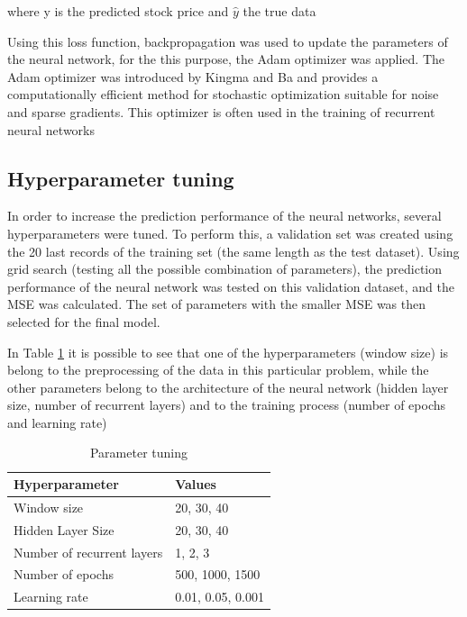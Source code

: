 \documentclass[10pt,twocolumn,letterpaper]{article}
\begin{document}
where y is the predicted stock price and $\hat{y}$ the true data

Using this loss function, backpropagation was used to update the parameters of the neural network, for the this purpose, the Adam optimizer was applied. The Adam optimizer was introduced by Kingma and Ba \cite{Kingma2015} and provides a computationally efficient method for stochastic optimization suitable for noise and sparse gradients. This optimizer is often used in the training of recurrent neural networks \cite{Zhao2020}

\subsection{Hyperparameter tuning}


In order to increase the prediction performance of the neural networks, several hyperparameters were tuned. To perform this, a validation set was created using the 20 last records of the training set (the same length as the test dataset). Using grid search (testing all the possible combination of parameters), the prediction performance of the neural network was tested on this validation dataset, and the MSE was calculated. The set of parameters with the smaller MSE was then selected for the final model.

In Table \ref{table:tuning} it is possible to see that one of the hyperparameters (window size) is belong to the preprocessing of the data in this particular problem, while the other parameters belong to the architecture of the neural network (hidden layer size, number of recurrent layers) and to the training process (number of epochs and learning rate)

\begin{table}[H]
	\begin{center}
		\begin{tabular}{|p{4.2cm}|p{3cm}|}
			\hline
			Hyperparameter & Values \\
			\hline\hline
			Window size & 20, 30, 40\\
			Hidden Layer Size & 20, 30, 40\\
			Number of recurrent layers & 1, 2, 3 \\
			Number of epochs & 500, 1000, 1500\\
			Learning rate & 0.01, 0.05, 0.001\\
			\hline
		\end{tabular}
	\end{center}
	\caption{Parameter tuning}
	\label{table:tuning}
\end{table}
\end{document}
